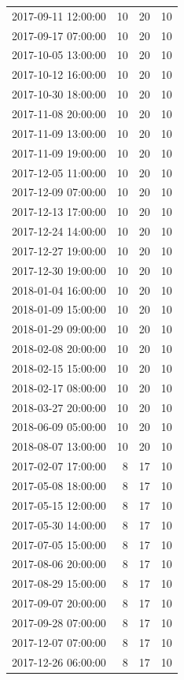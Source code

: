 \begin{tabular}{lrrr}
2017-09-11 12:00:00 & 10 & 20 & 10 \\
2017-09-17 07:00:00 & 10 & 20 & 10 \\
2017-10-05 13:00:00 & 10 & 20 & 10 \\
2017-10-12 16:00:00 & 10 & 20 & 10 \\
2017-10-30 18:00:00 & 10 & 20 & 10 \\
2017-11-08 20:00:00 & 10 & 20 & 10 \\
2017-11-09 13:00:00 & 10 & 20 & 10 \\
2017-11-09 19:00:00 & 10 & 20 & 10 \\
2017-12-05 11:00:00 & 10 & 20 & 10 \\
2017-12-09 07:00:00 & 10 & 20 & 10 \\
2017-12-13 17:00:00 & 10 & 20 & 10 \\
2017-12-24 14:00:00 & 10 & 20 & 10 \\
2017-12-27 19:00:00 & 10 & 20 & 10 \\
2017-12-30 19:00:00 & 10 & 20 & 10 \\
2018-01-04 16:00:00 & 10 & 20 & 10 \\
2018-01-09 15:00:00 & 10 & 20 & 10 \\
2018-01-29 09:00:00 & 10 & 20 & 10 \\
2018-02-08 20:00:00 & 10 & 20 & 10 \\
2018-02-15 15:00:00 & 10 & 20 & 10 \\
2018-02-17 08:00:00 & 10 & 20 & 10 \\
2018-03-27 20:00:00 & 10 & 20 & 10 \\
2018-06-09 05:00:00 & 10 & 20 & 10 \\
2018-08-07 13:00:00 & 10 & 20 & 10 \\
2017-02-07 17:00:00 & 8 & 17 & 10 \\
2017-05-08 18:00:00 & 8 & 17 & 10 \\
2017-05-15 12:00:00 & 8 & 17 & 10 \\
2017-05-30 14:00:00 & 8 & 17 & 10 \\
2017-07-05 15:00:00 & 8 & 17 & 10 \\
2017-08-06 20:00:00 & 8 & 17 & 10 \\
2017-08-29 15:00:00 & 8 & 17 & 10 \\
2017-09-07 20:00:00 & 8 & 17 & 10 \\
2017-09-28 07:00:00 & 8 & 17 & 10 \\
2017-12-07 07:00:00 & 8 & 17 & 10 \\
2017-12-26 06:00:00 & 8 & 17 & 10 \\

\end{tabular}
